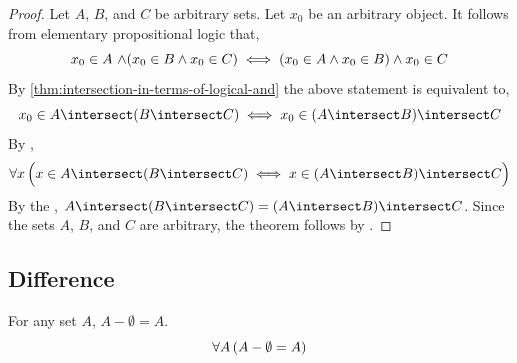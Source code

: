 \begin{proof}
    Let \( A \), \( B \), and \( C \) be arbitrary sets. Let \( x_{0} \) be an arbitrary object. It follows
    from elementary propositional logic that,
    \begin{equation*}
        x_{0} \in A \,\,{\land} \mleft( x_{0} \in B \land x_{0} \in C \mright)
        \iff \mleft( x_{0} \in A \land x_{0} \in B \mright) \land x_{0} \in C
    \end{equation*}
    By \cref{thm:intersection-in-terms-of-logical-and} the above statement is equivalent to,
    \begin{equation*}
        x_{0} \in A \intersect \mleft( B \intersect C \mright) \iff x_{0} \in \mleft( A \intersect B \mright) \intersect C
    \end{equation*}
    By ,
    \begin{equation*}
        \forall x \, \Big( x \in A \intersect \mleft( B \intersect C \mright)
        \iff x \in \mleft( A \intersect B \mright) \intersect C \Big)
    \end{equation*}
    By the , \( A \intersect \mleft( B \intersect C \mright) = \mleft( A \intersect B \mright) \intersect C \).
    Since the sets \( A \), \( B \), and \( C \) are arbitrary, the theorem follows by .
\end{proof}
\subsection{Difference}
\begin{thm}
    \label{set-identities:subtracing-empty-set-from-any-set-yields-the-set-itself}
    For any set \( A \), \( A - \emptyset = A \).
    \begin{equation*}
        \forall A \, \mleft( A - \emptyset = A \mright)
    \end{equation*}
\end{thm}

